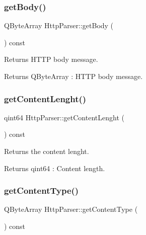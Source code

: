 \subsubsection{\texorpdfstring{get\+Body()}{getBody()}}
{\footnotesize\ttfamily Q\+Byte\+Array Http\+Parser\+::get\+Body (\begin{DoxyParamCaption}{ }\end{DoxyParamCaption}) const\hspace{0.3cm}{\ttfamily [inline]}}



Returns H\+T\+TP body message. 

\begin{DoxyReturn}{Returns}
Q\+Byte\+Array \+: H\+T\+TP body message. 
\end{DoxyReturn}
\mbox{\label{class_http_parser_ad42f6a0ff6ab987ccf526ac995af196f}} 
\subsubsection{\texorpdfstring{get\+Content\+Lenght()}{getContentLenght()}}
{\footnotesize\ttfamily qint64 Http\+Parser\+::get\+Content\+Lenght (\begin{DoxyParamCaption}{ }\end{DoxyParamCaption}) const\hspace{0.3cm}{\ttfamily [inline]}}



Returns the content lenght. 

\begin{DoxyReturn}{Returns}
qint64 \+: Content length. 
\end{DoxyReturn}
\mbox{\label{class_http_parser_a3adf500c4b0cf85d8249e071a7094f20}} 
\subsubsection{\texorpdfstring{get\+Content\+Type()}{getContentType()}}
{\footnotesize\ttfamily Q\+Byte\+Array Http\+Parser\+::get\+Content\+Type (\begin{DoxyParamCaption}{ }\end{DoxyParamCaption}) const\hspace{0.3cm}{\ttfamily [inline]}}




